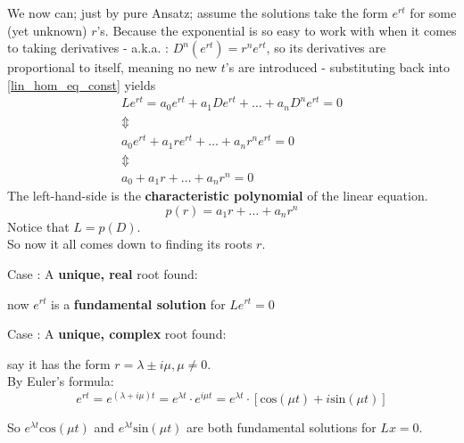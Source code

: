 We now can; just by pure Ansatz; assume the solutions take the form $e^{rt}$ for some (yet unknown) $r$'s. Because the exponential is so easy to work with when it comes to taking derivatives - a.k.a. : $D^n(e^{rt})=r^ne^{rt}$, so its derivatives are proportional to itself, meaning no new $t$'s are introduced - substituting back into \ref{lin_hom_eq_const} yields
\begin{gather*}
	Le^{rt} = a_0 e^{rt} + a_1 De^{rt} + \dots +a_{n} D^ne^{rt} = 0      \\
	\Updownarrow \\
	a_0 e^{rt}+a_1re^{rt} + \dots + a_nr^ne^{rt} =0 \\
	\Updownarrow \\
	a_0 + a_1r + \dots + a_nr^n =0
\end{gather*}
The left-hand-side is the \textbf{characteristic polynomial} of the linear equation.
\begin{equation}\label{lin_eq_char_poly}
	p(r) = a_1r + \dots + a_nr^n
\end{equation}
Notice that $L = p(D)$. \\
So now it all comes down to finding its roots $r$.

Case : A \textbf{unique, real} root found:

now $e^{rt}$ is a \textbf{fundamental solution} for $Le^{rt}=0$

Case : A \textbf{unique, complex} root found:

say it has the form $r = \lambda \pm i\mu, \mu \neq 0$. \\
By Euler's formula:
\begin{equation}\label{euler}
	e^{rt} = e^{(\lambda + i\mu)t} = e^{\lambda t} \cdot e^{i \mu t}  =  e^{\lambda t} \cdot [\text{cos}(\mu t) + i \text{sin}(\mu t)]
\end{equation}

So $e^{\lambda t}\text{cos}(\mu t)$ and $e^{\lambda t}\text{sin}(\mu t)$ are both fundamental solutions for $Lx=0$.

